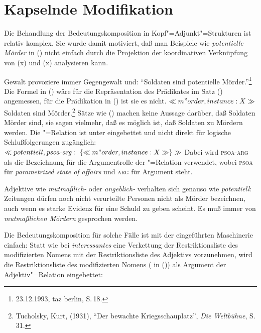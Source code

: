 \section{Kapselnde Modifikation}
\label{sec-kapselnde-Modifikation}

Die Behandlung der Bedeutungskomposition in Kopf"=Adjunkt"=Strukturen ist relativ komplex.
Sie wurde damit motiviert, daß man Beispiele wie \emph{potentielle Mörder} in ()
nicht einfach durch die Projektion der koordinativen Verknüpfung
von (x) und (x) analysieren kann.
\ea
\label{soldat}

Gewalt provoziere immer Gegengewalt und: "`Soldaten sind potentielle Mörder."'\footnote{
23.12.1993, taz berlin, S.\,18.
}
\z
Die Formel in () wäre für die Repräsentation des Prädikates im Satz () angemessen, für
die Prädikation in () ist sie es nicht.
\ea
$\ll m"order, instance:X\gg$
\z
\ea
Soldaten sind Mörder.\footnote{
  Tucholsky, Kurt, (1931), "`Der bewachte Kriegsschauplatz"', \emph{Die Weltbühne}, S.\,31.
}
\z
Sätze wie () machen keine Aussage darüber, daß Soldaten Mörder sind, sie sagen vielmehr,
daß es möglich ist, daß Soldaten zu Mördern werden. Die "=Relation ist unter 
eingebettet und nicht direkt für logische Schlußfolgerungen zugänglich:
\ea
\label{pot}
$\ll potentiell, \textit{psoa-arg} : ~\{ \ll m"order, instance:X\gg \} \gg$
\z
Dabei wird \textsc{psoa-arg} als die Bezeichnung für die Argumentrolle der "=Relation
verwendet, wobei \textsc{psoa} für \emph{parametrized state of affairs} und \textsc{arg} für Argument
steht.

Adjektive wie \emph{mutmaßlich-} oder \emph{angeblich-} verhalten sich genauso wie \emph{potentiell}:
Zeitungen dürfen noch nicht verurteilte Personen nicht als Mörder bezeichnen, auch wenn es starke Evidenz
für eine Schuld zu geben scheint. Es muß immer von \emph{mutmaßlichen Mördern} gesprochen werden.

Die Bedeutungskomposition für solche Fälle ist mit der eingeführten Maschinerie einfach: Statt
wie bei \emph{interessantes} eine Verkettung der Restriktionsliste des modifizierten Nomens mit
der Restriktionsliste des Adjektivs vorzunehmen, wird die Restriktionsliste des modifizierten
Nomens ( in ()) als Argument der Adjektiv"=Relation eingebettet:

